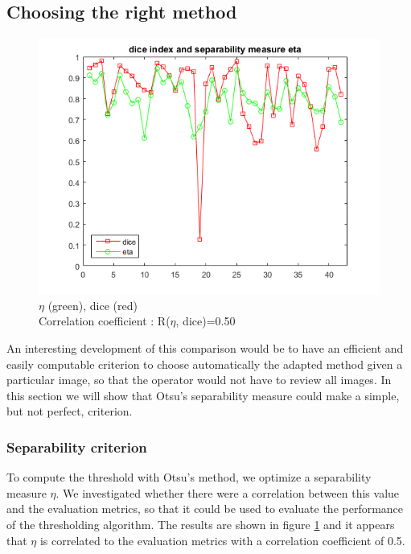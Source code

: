 \documentclass[a4paper,10pt]{article}
\begin{document}
\subsection{Choosing the right method}

\begin{figure}[h]
	\centering
	\includegraphics[width=0.6\linewidth]{../results/selection-criterion/otsu-dice-jaccard-eta-plot}
	\caption{$\eta$ (green), dice (red)\\ Correlation coefficient : R($\eta$, dice)=0.50 }
	\label{fig:eta-correlation}
\end{figure}

An interesting development of this comparison would be to have an efficient and easily computable criterion to choose automatically the adapted method given a particular image, so that the operator would not have to review all images. In this section we will show that Otsu's separability measure could make a simple, but not perfect, criterion.

\subsubsection*{Separability criterion}



To compute the threshold with Otsu's method, we optimize a separability measure $\eta$. We investigated whether there were a correlation between this value and the evaluation metrics, so that it could be used to evaluate the performance of the thresholding algorithm. The results are shown in figure \ref{fig:eta-correlation} and it appears that $\eta$ is correlated to the evaluation metrics with a correlation coefficient of 0.5.
\end{document}
